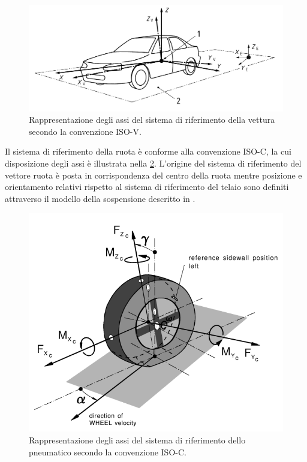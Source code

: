 \begin{figure}[h]
	\centering
	\includegraphics[width=0.7\linewidth]{Figures/iso_convention}
	\caption{Rappresentazione degli assi del sistema di riferimento della vettura secondo la convenzione ISO-V.}
	\label{isoconventionv}
\end{figure}
%
\noindent
Il sistema di riferimento della ruota è conforme alla convenzione \ac{ISO}-C, la cui disposizione degli assi è illustrata nella \figurename{ \ref{isoconventionc}}. L'origine del sistema di riferimento del vettore ruota è posta in corrispondenza del centro della ruota mentre posizione e orientamento relativi rispetto al sistema di riferimento del telaio sono definiti attraverso il modello della sospensione descritto in \cite{Larcher}.

\begin{figure}[h]
	\centering
	\includegraphics[width=0.7\linewidth]{Figures/iso_convention_wheel}
	\caption{Rappresentazione degli assi  del sistema di riferimento dello pneumatico secondo la convenzione ISO-C.}
	\label{isoconventionc}
\end{figure}
%
